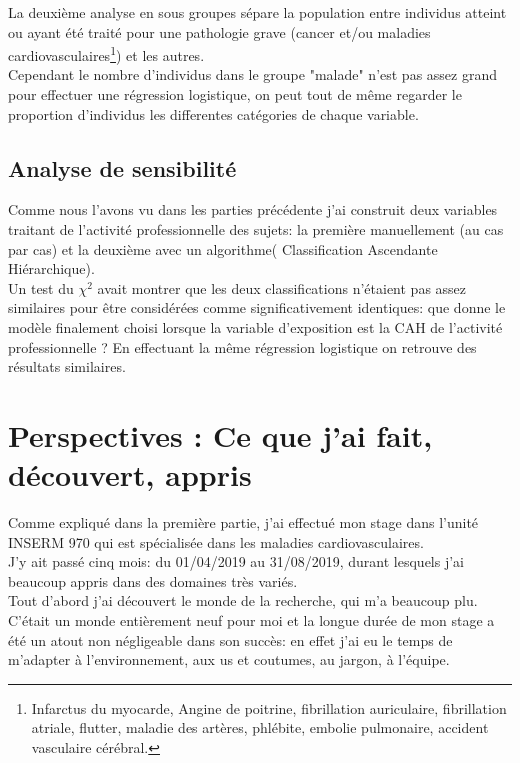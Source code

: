 \documentclass{book}
\begin{document}
La deuxième analyse en sous groupes sépare la population entre individus atteint ou ayant été traité pour une pathologie grave (cancer et/ou maladies cardiovasculaires\footnote{Infarctus du myocarde, Angine de poitrine, fibrillation auriculaire, fibrillation atriale, flutter, maladie des artères, phlébite, embolie pulmonaire, accident vasculaire cérébral.}) et les autres.\\
Cependant le nombre d'individus dans le groupe "malade" n'est pas assez grand pour effectuer une régression logistique, on peut tout de même regarder le proportion d'individus les differentes catégories de chaque variable.\\
\subsection{Analyse de sensibilité}
Comme nous l'avons vu dans les parties précédente j'ai construit deux variables traitant de l'activité professionnelle des sujets: la première manuellement (au cas par cas) et la deuxième avec un algorithme( Classification Ascendante Hiérarchique).\\
Un test du $\chi ^2$ avait montrer que les deux classifications n'étaient pas assez similaires pour être considérées comme significativement identiques: que donne le modèle finalement choisi lorsque la variable d'exposition est la CAH de l'activité professionnelle ?
En effectuant la même régression logistique on retrouve des résultats similaires.\\

\newpage
\section{Perspectives : Ce que j'ai fait, découvert, appris}

\noindent
Comme expliqué dans la première partie, j'ai effectué mon stage dans l'unité INSERM 970 qui est spécialisée dans les maladies cardiovasculaires.\\
J'y ait passé cinq mois: du 01/04/2019 au 31/08/2019, durant lesquels j'ai beaucoup appris dans des domaines très variés.\\
Tout d'abord j'ai découvert le monde de la recherche, qui m'a beaucoup plu. C'était un monde entièrement neuf pour moi et la longue durée de mon stage a été un atout non négligeable dans son succès: en effet j'ai eu le temps de m'adapter à l'environnement, aux us et coutumes, au jargon, à l'équipe.\\
\end{document}
